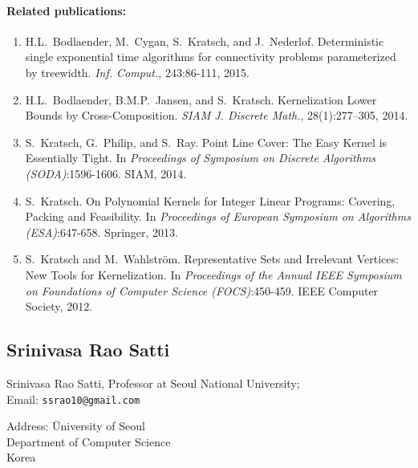 \documentclass[a4paper,10pt]{article}
\begin{document}
\paragraph{Related publications:}
\begin{enumerate}
\item H.L.~Bodlaender, M.~Cygan, S.~Kratsch, and J.~Nederlof. \newblock Deterministic single exponential time algorithms for connectivity problems parameterized by treewidth. \newblock \emph{Inf. Comput.}, 243:86-111, 2015.
\item H.L.~Bodlaender, B.M.P.~Jansen, and S.~Kratsch. \newblock Kernelization Lower Bounds by Cross-Composition. \newblock \emph{{SIAM} J. Discrete Math.}, 28(1):277--305, 2014.
\item S.~Kratsch, G.~Philip, and S.~Ray. \newblock Point Line Cover: The Easy Kernel is Essentially Tight. \newblock In \emph{Proceedings of Symposium on Discrete Algorithms (SODA)}:1596-1606. SIAM, 2014.
\item S.~Kratsch. \newblock On Polynomial Kernels for Integer Linear Programs: Covering, Packing and Feasibility. \newblock In \emph{Proceedings of European Symposium on Algorithms (ESA)}:647-658. Springer, 2013.
\item S.~Kratsch and M.~Wahlstr\"om. \newblock Representative Sets and Irrelevant Vertices: New Tools for Kernelization. \newblock In \emph{Proceedings of the Annual IEEE Symposium on Foundations of
  Computer Science (FOCS)}:450-459. IEEE Computer Society, 2012.
\end{enumerate}

\subsection*{Srinivasa Rao Satti}

\begin{multicols}{2}
\noindent Srinivasa Rao Satti, Professor at Seoul National  University; \\
Email: \texttt{ssrao10@gmail.com} \\
\begin{tabbing}
Address: \=  University of Seoul\\
\> Department of Computer Science\\
\> Korea
\end{tabbing}
\end{multicols}
\end{document}

